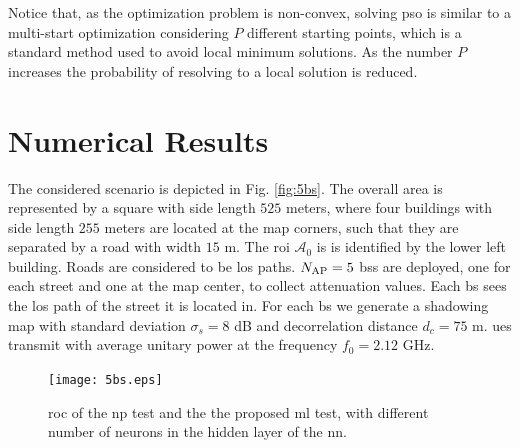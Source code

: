 \documentclass[conference,final]{IEEEtran}
\begin{document}


      
    

Notice that, as the optimization problem is non-convex, solving \ac{pso} is similar to a multi-start optimization considering $P$ different starting points, which is a standard method used to avoid local minimum solutions. As the number $P$ increases the probability of resolving to a local solution is reduced.

\section{Numerical Results}\label{sec: nr}

The considered scenario is depicted in Fig. \ref{fig:5bs}. The overall area is represented by a square with side length $525$ meters, where four buildings with side length $255$ meters are located at the map corners, such that they are separated by a road with width $15$ m. The \ac{roi} $\mathcal{A}_0$ is is identified by the lower left building. Roads are considered to be \ac{los} paths. $N_{\rm AP}=5$ \acp{bs} are deployed, one for each street and one at the map center, to collect attenuation values. Each \ac{bs} sees the \ac{los} path of the street it is located in. For each \ac{bs} we generate a shadowing map with standard deviation $\sigma_s = 8$ dB and decorrelation distance $d_c = 75$ m. \acp{ue} transmit with average unitary power at the frequency $f_0 = 2.12$ GHz.

 \begin{figure}[h]
     \centering
     \texttt{[image: 5bs.eps]}
     \caption{\ac{roc} of the \ac{np} test and the the proposed \ac{ml} test,  with different number of neurons in the hidden layer of the \ac{nn}.}
     \label{fig:NP_comp}
 \end{figure}
\end{document}
